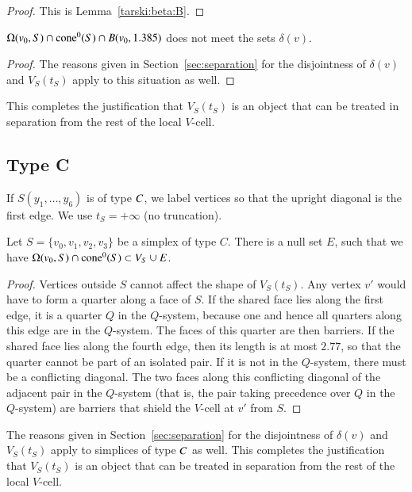 \begin{proof} This is Lemma~\ref{tarski:beta:B}.
\end{proof}

\begin{lemma} $\Omega(v_0,S) \cap {\operatorname{cone}}^0(S) \cap B(v_0,1.385)$
does not meet the sets $\delta(v)$.
\end{lemma}

\begin{proof}
The reasons given in Section~\ref{sec:separation} for the
disjointness of $\delta(v)$ and $V_S(t_S)$ apply to this
situation as well.
\end{proof}


This completes the justification that
$V_S(t_S)$ is an object that can be treated in separation from the
rest of the local $V$-cell.

\subsection{Type C}%

If $S(y_1,\ldots,y_6)$ is of type $C$, we label vertices so that
the upright diagonal is the first edge.  We use $t_S =+\infty$ (no
truncation).   

\begin{lemma} Let $S=\{v_0,v_1,v_2,v_3\}$ be a simplex of type $C$.
There is a null set $E$, such that
we have  $ \Omega(v_0,S) \cap {\operatorname{cone}}^0(S) \subset V_S \cup E$.
\end{lemma}

\begin{proof}  %
Vertices outside $S$ cannot affect the shape of $V_S(t_S)$.  Any
vertex $v'$ would have to form a quarter along a face of $S$.  If
the shared face lies along the first edge, it is a quarter $Q$ in
the $Q$-system, because one and hence all quarters along this edge
are in the $Q$-system.  The faces of this quarter are then
barriers. If the shared face lies along the fourth edge, then its
length is at most $2.77$, so that the quarter cannot be part of an
isolated pair. If it is not in the $Q$-system, there must be a
conflicting diagonal. The two faces along this conflicting
diagonal of the adjacent pair in the $Q$-system (that is, the pair
taking precedence over $Q$ in the $Q$-system) are barriers that
shield the $V$-cell at $v'$ from $S$.
\end{proof}

The reasons given in Section~\ref{sec:separation} for the
disjointness of $\delta(v)$ and $V_S(t_S)$ apply to simplices of
type $C$ as well. This completes the justification that
$V_S(t_S)$ is an object that can be treated in separation from the
rest of the local $V$-cell.

